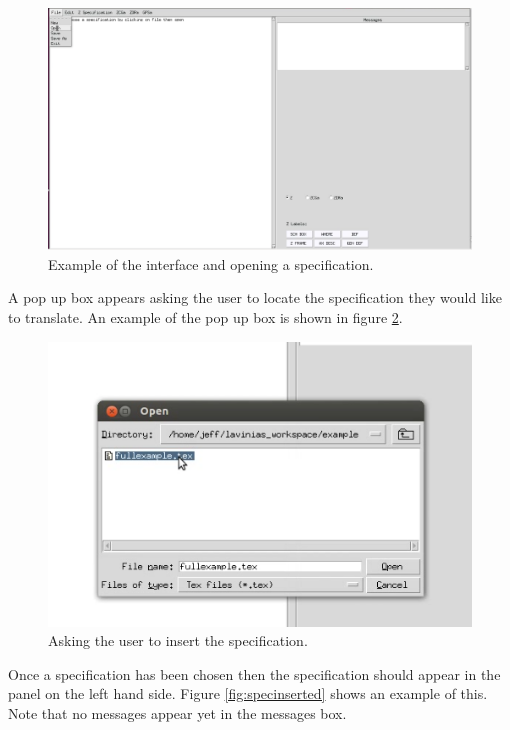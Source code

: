 \begin{figure}[H]
\includegraphics[scale=0.4]{Figures/Interface/openspec.png}
\caption{Example of the interface and opening a specification. \label{fig:openspec}}
\end{figure}

A pop up box appears asking the user to locate the specification they would like to translate. An example of the pop up box is shown in figure \ref{fig:choosespec}. 

\begin{figure}[H]
\includegraphics[scale=0.6]{Figures/Interface/choosespec.png}
\caption{Asking the user to insert the specification. \label{fig:choosespec}}
\end{figure}

Once a specification has been chosen then the specification should appear in the panel on the left hand side. Figure \ref{fig:specinserted} shows an example of this. Note that no messages appear yet in the messages box.

